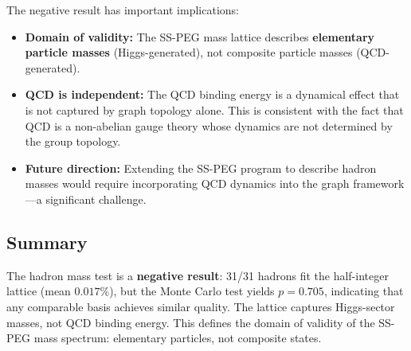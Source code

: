 The negative result has important implications:
\begin{itemize}
\item \textbf{Domain of validity:} The SS-PEG mass lattice describes \textbf{elementary particle masses} (Higgs-generated), not composite particle masses (QCD-generated).
\item \textbf{QCD is independent:} The QCD binding energy is a dynamical effect that is not captured by graph topology alone. This is consistent with the fact that QCD is a non-abelian gauge theory whose dynamics are not determined by the group topology.
\item \textbf{Future direction:} Extending the SS-PEG program to describe hadron masses would require incorporating QCD dynamics into the graph framework---a significant challenge.
\end{itemize}

\subsection{Summary}\label{sec:hadron_summary}

The hadron mass test is a \textbf{negative result}: 31/31 hadrons fit the half-integer lattice (mean $0.017\%$), but the Monte Carlo test yields $p = 0.705$, indicating that any comparable basis achieves similar quality. The lattice captures Higgs-sector masses, not QCD binding energy. This defines the domain of validity of the SS-PEG mass spectrum: elementary particles, not composite states.

